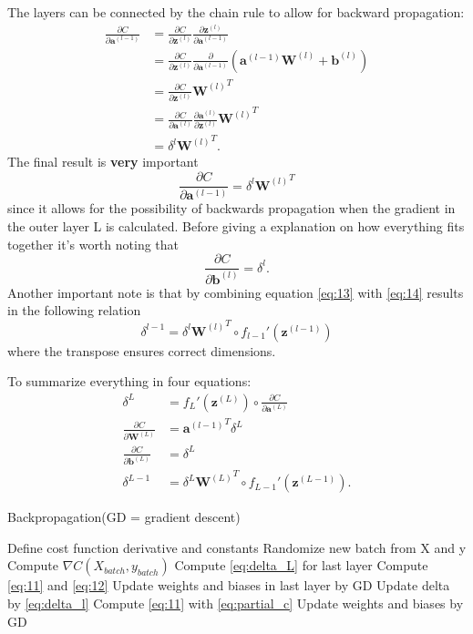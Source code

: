 \documentclass[uio,jmp,amsmath,amssymb,reprint,nofootinbib]{revtex4-1}
\numberwithin{equation}{section}
\newcommand{\lp}{\left(}
\newcommand{\rp}{\right)}
\begin{document}
The layers can be connected by the chain rule to allow for backward propagation:
\begin{align}
\frac{\partial C}{\partial \bm{a}^{(l-1)}} &= \frac{\partial C}{\partial \bm{z}^{(l)}}\frac{\partial \bm{z}^{(l)}}{\partial \bm{a}^{(l-1)}}\\
&= \frac{\partial C}{\partial \bm{z}^{(l)}}\frac{\partial}{\partial \bm{a}^{(l-1)}}\lp \bm{a}^{(l-1)}\bm{W}^{(l)} + \bm{b}^{(l)}\rp\\
&= \frac{\partial C}{\partial \bm{z}^{(l)}}{\bm{W}^{(l)}}^T\\
&= \frac{\partial C}{\partial \bm{a}^{(l)}} \frac{\partial \bm{a}^{(l)}}{\partial \bm{z}^{(l)}}{\bm{W}^{(l)}}^T\\
&= \delta^l {\bm{W}^{(l)}}^T.
\end{align}
The final result is \textbf{very} important
\begin{equation}\label{eq:14}
\frac{\partial C}{\partial \bm{a}^{(l-1)}} = \delta^l {\bm{W}^{(l)}}^T
\end{equation}
since it allows for the possibility of backwards propagation when the gradient in the outer layer L is calculated. Before giving a explanation on how everything fits together it's worth noting that
\begin{equation}
\frac{\partial C}{\partial \bm{b}^{(l)}} = \delta^l.
\end{equation}
Another important note is that by combining equation \ref{eq:13} with \ref{eq:14} results in the following relation
\begin{equation}
\delta^{l-1} = \delta^l {\bm{W}^{(l)}}^T \circ f_{l-1}'(\bm{z}^{(l-1)})
\end{equation}
where the transpose ensures correct dimensions.

To summarize everything in four equations:
\begin{align}\label{eq:delta_L}
\delta^L &= f_L'(\bm{z}^{(L)})\circ\frac{\partial C}{\partial \bm{a}^{(L)}}\\\label{eq:partial_c}
\frac{\partial C}{\partial \bm{W}^{(L)}} &= {\bm{a}^{(l-1)}}^T\delta^L\\
\frac{\partial C}{\partial \bm{b}^{(L)}} &= \delta^L\\ \label{eq:delta_l}
\delta^{L-1} &= \delta^L {\bm{W}^{(L)}}^T \circ f_{L-1}'(\bm{z}^{(L-1)}).
\end{align}

\begin{algorithm}[H]
\caption{Backpropagation(GD = gradient descent)}
\begin{algorithmic}
\State Define cost function derivative and constants
\State Randomize new batch from X and y
\State Compute \(\nabla C(X_{batch}, y_{batch})\)
\State Compute \ref{eq:delta_L} for last layer
\State Compute \ref{eq:11} and \ref{eq:12}
\State Update weights and biases in last layer by GD
\State Update delta by \ref{eq:delta_l}
\State Compute \ref{eq:11} with \ref{eq:partial_c}
\State Update weights and biases by GD
\EndFor
\EndFor
\end{algorithmic}
\label{alg:02}
\end{algorithm}
\end{document}
